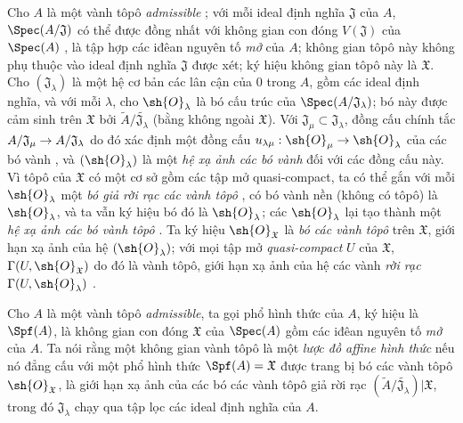 \documentclass[oneside]{amsart}
\makeatletter
\newcommand{\ega@arrow}[2]{\mathchoice{#1}{#2}{#2}{#2}}
\renewcommand{\to}{\ega@arrow{\longrightarrow}{\rightarrow}}
\newcommand{\oldpage}[2][]{{\marginnote{\normalfont\textbf{#1}~|~#2}}\ignorespaces}
\let\EGAOriginalLabel\label
\renewcommand{\label}[1]{\phantomsection\EGAOriginalLabel{#1}}
\makeatother
\begin{document}
\begin{env}[10.1.1]
\label{I.10.1.1}
Cho $A$ là một vành tôpô \emph{admissible} ; với mỗi ideal định nghĩa $\mathfrak{J}$ của $A$, $\Spec(A/\mathfrak{J})$ có thể được đồng nhất với không gian con đóng $V(\mathfrak{J})$ của $\Spec(A)$ , là tập hợp các iđêan nguyên tố \emph{mở} của $A$; không gian tôpô này không phụ thuộc
\oldpage[I]{181}
vào ideal định nghĩa $\mathfrak{J}$ được xét; ký hiệu không gian tôpô này là $\mathfrak{X}$. Cho $(\mathfrak{J}_\lambda)$ là một hệ cơ bản các lân cận của $0$ trong $A$, gồm các ideal định nghĩa, và với mỗi $\lambda$, cho $\sh{O}_\lambda$ là bó cấu trúc của $\Spec(A/\mathfrak{J}_\lambda)$; bó này được cảm sinh trên $\mathfrak{X}$ bởi $\widetilde{A}/\widetilde{\mathfrak{J}_\lambda}$ (bằng không ngoài $\mathfrak{X}$).
Với $\mathfrak{J}_\mu\subset\mathfrak{J}_\lambda$, đồng cấu chính tắc $A/\mathfrak{J}_\mu\to A/\mathfrak{J}_\lambda$ do đó xác định một đồng cấu $u_{\lambda\mu}:\sh{O}_\mu\to\sh{O}_\lambda$ của các bó vành , và $(\sh{O}_\lambda)$ là một \emph{hệ xạ ảnh các bó vành} đối với các đồng cấu này.
Vì tôpô của $\mathfrak{X}$ có một cơ sở gồm các tập mở quasi-compact, ta có thể gắn với mỗi $\sh{O}_\lambda$ một \emph{bó giả rời rạc các vành tôpô} , có bó vành nền (không có tôpô) là $\sh{O}_\lambda$, và ta vẫn ký hiệu bó đó là $\sh{O}_\lambda$; các $\sh{O}_\lambda$ lại tạo thành một \emph{hệ xạ ảnh các bó vành tôpô} .
Ta ký hiệu $\sh{O}_\mathfrak{X}$ là \emph{bó các vành tôpô} trên $\mathfrak{X}$, giới hạn xạ ảnh của hệ $(\sh{O}_\lambda)$; với mọi tập mở \emph{quasi-compact} $U$ của $\mathfrak{X}$, $\Gamma(U,\sh{O}_\mathfrak{X})$ do đó là vành tôpô, giới hạn xạ ảnh của hệ các vành \emph{rời rạc} $\Gamma(U,\sh{O}_\lambda)$ .
\end{env}

\begin{definition}[10.1.2]
\label{I.10.1.2}
Cho $A$ là một vành tôpô \emph{admissible}, ta gọi phổ hình thức của $A$, ký hiệu là $\Spf(A)$, là không gian con đóng $\mathfrak{X}$ của $\Spec(A)$ gồm các iđêan nguyên tố \emph{mở} của $A$.
Ta nói rằng một không gian vành tôpô là một \emph{lược đồ affine hình thức} nếu nó đẳng cấu với một phổ hình thức $\Spf(A)=\mathfrak{X}$ được trang bị bó các vành tôpô $\sh{O}_\mathfrak{X}$, là giới hạn xạ ảnh của các bó các vành tôpô giả rời rạc $(\widetilde{A}/\widetilde{\mathfrak{J}_\lambda})|\mathfrak{X}$, trong đó $\mathfrak{J}_\lambda$ chạy qua tập lọc các ideal định nghĩa của $A$.
\end{definition}
\end{document}
